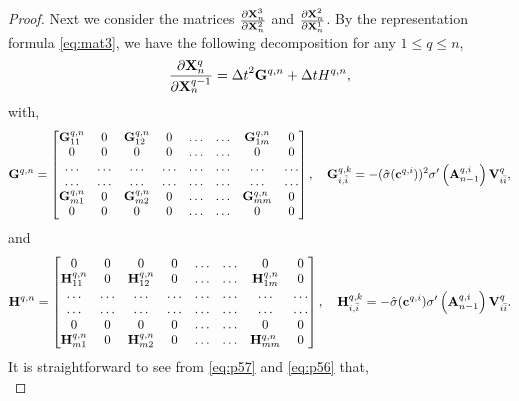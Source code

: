 \documentclass{article}
\newcommand{\bV}{{\bf V}}
\newcommand{\bA}{{\bf A}}
\newcommand{\bX}{{\bf X}}
\newcommand{\bc}{{\bf c}}
\newcommand{\Dt}{{\Delta t}}
\begin{document}
\begin{proof}
Next we consider the matrices $\frac{\partial \bX^{3}_n}{\partial \bX^{2}_n}$ and $\frac{\partial \bX^{2}_n}{\partial \bX^{1}_n}$. By the representation formula \eqref{eq:mat3}, we have the following decomposition for any $1 \leq q \leq n$,
\begin{equation}
    \label{eq:p55}
     \frac{\partial \bX^q_n}{\partial \bX^{q-1}_{n}} = \Dt^2 {\bf G}^{q,n} + \Dt H^{q,n},
\end{equation}
with,
\begin{equation}
    \label{eq:p56}
 {\bf G}^{q,n}     = \begin{bmatrix}
     {\bf G}^{q,n}_{11} & 0 & {\bf G}^{q,n}_{12} & 0 &\ldots &\ldots &{\bf G}^{q,n}_{1m} & 0 \\
     0 & 0 & 0 & 0 &\ldots &\ldots & 0 & 0 \\
     \ldots & \ldots & \ldots & \ldots & \ldots & \ldots & \ldots & \ldots \\
      \ldots & \ldots & \ldots & \ldots & \ldots & \ldots & \ldots & \ldots \\
      {\bf G}^{q,n}_{m1} & 0 & {\bf G}^{q,n}_{m2} & 0 &\ldots &\ldots &{\bf G}^{q,n}_{mm} & 0 \\ 
      0 & 0 & 0 & 0 &\ldots &\ldots & 0 & 0 
\end{bmatrix}, \quad {\bf G}^{q,k}_{i,\bar{i}} = - (\hat{\sigma}(\bc^{q,i}))^2 \sigma^{\prime}\left(\bA^{q,i}_{n-1}\right)\bV^q_{i\bar{i}},
\end{equation}
and
\begin{equation}
    \label{eq:p57}
 {\bf H}^{q,n}     = \begin{bmatrix}
  0 & 0 & 0 & 0 &\ldots &\ldots & 0 & 0 \\
     {\bf H}^{q,n}_{11} & 0 & {\bf H}^{q,n}_{12} & 0 &\ldots &\ldots &{\bf H}^{q,n}_{1m} & 0 \\
     \ldots & \ldots & \ldots & \ldots & \ldots & \ldots & \ldots & \ldots \\
      \ldots & \ldots & \ldots & \ldots & \ldots & \ldots & \ldots & \ldots \\
       0 & 0 & 0 & 0 &\ldots &\ldots & 0 & 0 \\
      {\bf H}^{q,n}_{m1} & 0 & {\bf H}^{q,n}_{m2} & 0 &\ldots &\ldots &{\bf H}^{q,n}_{mm} & 0
\end{bmatrix}, \quad {\bf H}^{q,k}_{i,\bar{i}} = - \hat{\sigma}(\bc^{q,i}) \sigma^{\prime}\left(\bA^{q,i}_{n-1}\right)\bV^q_{i\bar{i}}.
\end{equation}
It is straightforward to see from \eqref{eq:p57} and \eqref{eq:p56} that,
\begin{equation}

\end{equation}
\end{proof}
\end{document}
